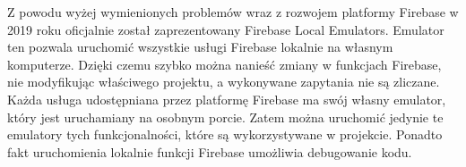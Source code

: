 Z powodu wyżej wymienionych problemów wraz z rozwojem platformy Firebase w 2019 roku oficjalnie został zaprezentowany Firebase Local Emulators. Emulator ten pozwala uruchomić wszystkie usługi Firebase lokalnie na własnym komputerze. Dzięki czemu szybko można nanieść zmiany w funkcjach Firebase, nie modyfikując właściwego projektu, a wykonywane zapytania nie są zliczane. \\

Każda usługa udostępniana przez platformę Firebase ma swój własny emulator, który jest uruchamiany na osobnym porcie. Zatem można uruchomić jedynie te emulatory tych funkcjonalności, które są wykorzystywane w projekcie. Ponadto fakt uruchomienia lokalnie funkcji Firebase  umożliwia debugowanie kodu.



